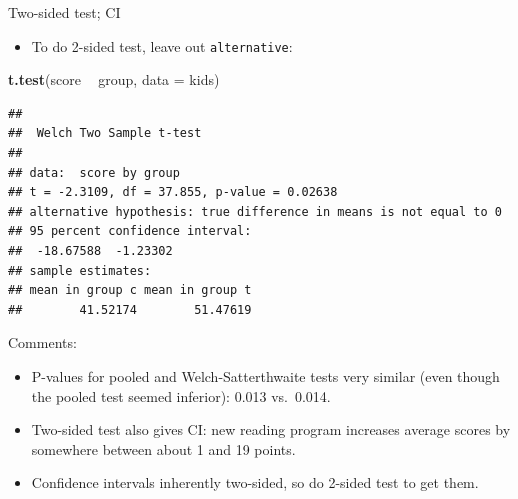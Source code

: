 \documentclass[
  ignorenonframetext,
]{beamer}
\newenvironment{Shaded}{\begin{snugshade}}{\end{snugshade}}
\newcommand{\DataTypeTok}[1]{\textcolor[rgb]{0.13,0.29,0.53}{#1}}
\newcommand{\KeywordTok}[1]{\textcolor[rgb]{0.13,0.29,0.53}{\textbf{#1}}}
\newcommand{\NormalTok}[1]{#1}
\newcommand{\OperatorTok}[1]{\textcolor[rgb]{0.81,0.36,0.00}{\textbf{#1}}}
\newcommand{\StringTok}[1]{\textcolor[rgb]{0.31,0.60,0.02}{#1}}
\providecommand{\tightlist}{%
  \setlength{\itemsep}{0pt}\setlength{\parskip}{0pt}}
\begin{document}
\begin{frame}[fragile]{Two-sided test; CI}
\protect\hypertarget{two-sided-test-ci}{}

\begin{itemize}
\tightlist
\item
  To do 2-sided test, leave out \texttt{alternative}:
\end{itemize}

\begin{Shaded}
\begin{Highlighting}[]
\KeywordTok{t.test}\NormalTok{(score }\OperatorTok{~}\StringTok{ }\NormalTok{group, }\DataTypeTok{data =}\NormalTok{ kids)}
\end{Highlighting}
\end{Shaded}

\begin{verbatim}
## 
##  Welch Two Sample t-test
## 
## data:  score by group
## t = -2.3109, df = 37.855, p-value = 0.02638
## alternative hypothesis: true difference in means is not equal to 0
## 95 percent confidence interval:
##  -18.67588  -1.23302
## sample estimates:
## mean in group c mean in group t 
##        41.52174        51.47619
\end{verbatim}

\end{frame}

\begin{frame}{Comments:}
\protect\hypertarget{comments-2}{}

\begin{itemize}
\tightlist
\item
  P-values for pooled and Welch-Satterthwaite tests very similar (even
  though the pooled test seemed inferior): 0.013 vs.~0.014.
\item
  Two-sided test also gives CI: new reading program increases average
  scores by somewhere between about 1 and 19 points.
\item
  Confidence intervals inherently two-sided, so do 2-sided test to get
  them.
\end{itemize}

\end{frame}
\end{document}
